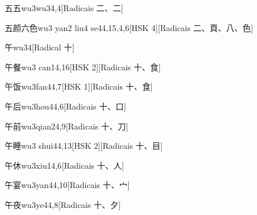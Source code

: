 \begin{entry}{五五}{wu3wu3}{4,4}[Radicais ⼆、⼆]
\end{entry}

\begin{entry}{五颜六色}{wu3 yan2 liu4 se4}{4,15,4,6}[HSK 4][Radicais ⼆、⾴、⼋、⾊]
\end{entry}

\begin{entry}{午}{wu3}{4}[Radical ⼗]
\end{entry}

\begin{entry}{午餐}{wu3 can1}{4,16}[HSK 2][Radicais ⼗、⾷]
\end{entry}

\begin{entry}{午饭}{wu3fan4}{4,7}[HSK 1][Radicais ⼗、⾷]
\end{entry}

\begin{entry}{午后}{wu3hou4}{4,6}[Radicais ⼗、⼝]
\end{entry}

\begin{entry}{午前}{wu3qian2}{4,9}[Radicais ⼗、⼑]
\end{entry}

\begin{entry}{午睡}{wu3 shui4}{4,13}[HSK 2][Radicais ⼗、⽬]
\end{entry}

\begin{entry}{午休}{wu3xiu1}{4,6}[Radicais ⼗、⼈]
\end{entry}

\begin{entry}{午宴}{wu3yan4}{4,10}[Radicais ⼗、⼧]
\end{entry}

\begin{entry}{午夜}{wu3ye4}{4,8}[Radicais ⼗、⼣]
\end{entry}

